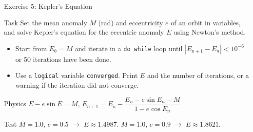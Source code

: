 \begin{frame}{Exercise 5: Kepler's Equation}
  \begin{block}{Task}
  Set the mean anomaly $M$ (rad) and eccentricity $e$ of an orbit in variables, and solve Kepler's equation for the eccentric anomaly $E$ using Newton's method.
  \begin{itemize}
    \item Start from $E_0 = M$ and iterate in a \texttt{do while} loop until $|E_{n+1} - E_n| < 10^{-6}$ or 50 iterations have been done.
    \item Use a \texttt{logical} variable \texttt{converged}. Print $E$ and the number of iterations, or a warning if the iteration did not converge.
  \end{itemize}
  \end{block}
  \begin{block}{Physics}
  $E - e \sin E = M$, \qquad $E_{n+1} = E_n - \dfrac{E_n - e \sin E_n - M}{1 - e \cos E_n}$
  \end{block}
  \begin{block}{Test}
  $M = 1.0$, $e = 0.5$ $\to$ $E \approx 1.4987$. \quad $M = 1.0$, $e = 0.9$ $\to$ $E \approx 1.8621$.
  \end{block}
\end{frame}


